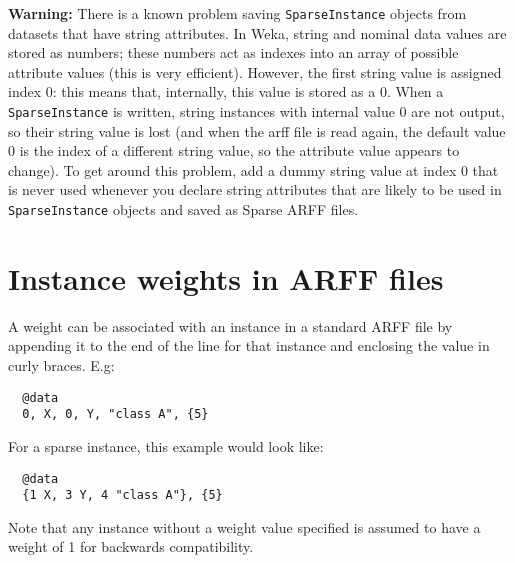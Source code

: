 \textbf{Warning:} There is a known problem saving \texttt{SparseInstance} objects from datasets that have string attributes. In Weka, string and nominal data values are stored as numbers; these numbers act as indexes into an array of possible attribute values (this is very efficient). However, the first string value is assigned index 0: this means that, internally, this value is stored as a 0. When a \texttt{SparseInstance} is written, string instances with internal value 0 are not output, so their string value is lost (and when the arff file is read again, the default value 0 is the index of a different string value, so the attribute value appears to change). To get around this problem, add a dummy string value at index 0 that is never used whenever you declare string attributes that are likely to be used in \texttt{SparseInstance} objects and saved as Sparse ARFF files.

\section{Instance weights in ARFF files}
A weight can be associated with an instance in a standard ARFF file by appending it to the end of the line for that instance and enclosing the value in curly braces. E.g:

\begin{verbatim}
  @data
  0, X, 0, Y, "class A", {5}
\end{verbatim}

\noindent For a sparse instance, this example would look like:

\begin{verbatim}
  @data
  {1 X, 3 Y, 4 "class A"}, {5}
\end{verbatim}

\noindent Note that any instance without a weight value specified is assumed to have a weight of 1 for backwards compatibility.
